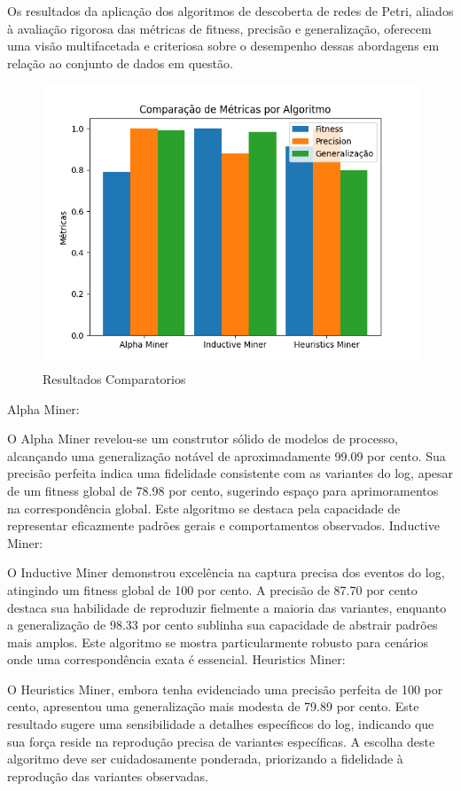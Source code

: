 \documentclass[tcc2]{classe_uftex/uftex}
\begin{document}
Os resultados da aplicação dos algoritmos de descoberta de redes de Petri, aliados à avaliação rigorosa das métricas de fitness, precisão e generalização, oferecem uma visão multifacetada e criteriosa sobre o desempenho dessas abordagens em relação ao conjunto de dados em questão.

\begin{figure}[h]
    \centering
    \includegraphics[width=12cm]{tcc_example/Figure_1.png}
    \caption{Resultados Comparatorios}
\end{figure}

Alpha Miner:

O Alpha Miner revelou-se um construtor sólido de modelos de processo, alcançando uma generalização notável de aproximadamente 99.09 por cento. Sua precisão perfeita indica uma fidelidade consistente com as variantes do log, apesar de um fitness global de 78.98 por cento, sugerindo espaço para aprimoramentos na correspondência global. Este algoritmo se destaca pela capacidade de representar eficazmente padrões gerais e comportamentos observados.
Inductive Miner:

O Inductive Miner demonstrou excelência na captura precisa dos eventos do log, atingindo um fitness global de 100 por cento. A precisão de 87.70 por cento destaca sua habilidade de reproduzir fielmente a maioria das variantes, enquanto a generalização de 98.33 por cento sublinha sua capacidade de abstrair padrões mais amplos. Este algoritmo se mostra particularmente robusto para cenários onde uma correspondência exata é essencial.
Heuristics Miner:

O Heuristics Miner, embora tenha evidenciado uma precisão perfeita de 100 por cento, apresentou uma generalização mais modesta de 79.89 por cento. Este resultado sugere uma sensibilidade a detalhes específicos do log, indicando que sua força reside na reprodução precisa de variantes específicas. A escolha deste algoritmo deve ser cuidadosamente ponderada, priorizando a fidelidade à reprodução das variantes observadas.
\end{document}
